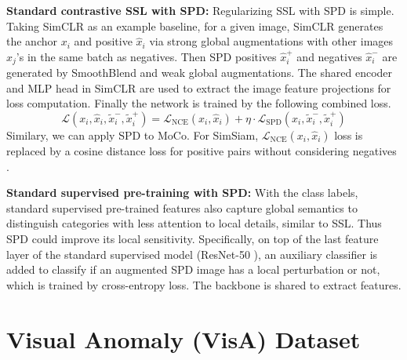 \noindent\textbf{Standard contrastive SSL with SPD:} Regularizing SSL with SPD is simple. Taking SimCLR as an example baseline, for a given image, SimCLR generates the anchor $x_i$ and positive $\hat{x}_i$ via strong global augmentations with other images $x_j$'s in the same batch as negatives. Then SPD positives $\hat{x}_i^+$ and negatives $\hat{x}_i^-$ are generated by SmoothBlend and weak global augmentations. The shared encoder and MLP head in SimCLR are used to extract the image feature projections for loss computation. Finally the network is trained by the following combined loss.
\begin{equation}
    \mathcal{L}(x_i,\hat{x}_i,\tilde{x}_i^-,\tilde{x}_i^+) = \mathcal{L}_{\mathrm{NCE}}(x_i,\hat{x}_i) + \eta \cdot \mathcal{L}_{\mathrm{SPD}}(x_i,\tilde{x}_i^-,\tilde{x}_i^+)
\end{equation}
Similary, we can apply SPD to MoCo. For SimSiam, $\mathcal{L}_{\mathrm{NCE}}(x_i,\hat{x}_i)$ loss is replaced by a cosine distance loss for positive pairs without considering negatives \cite{chen2021exploring}.

\noindent\textbf{Standard supervised pre-training with SPD:} With the class labels, standard supervised pre-trained features also capture global semantics to distinguish categories with less attention to local details, similar to SSL. Thus SPD could improve its local sensitivity. Specifically, on top of the last feature layer of the standard supervised model (ResNet-50 \cite{he2016deep}), an auxiliary classifier is added to classify if an augmented SPD image has a local perturbation or not, which is trained by cross-entropy loss. The backbone is shared to extract features.
\section{Visual Anomaly (VisA) Dataset}

